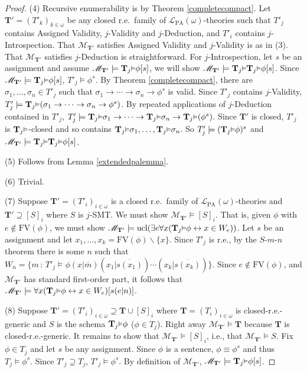 \documentclass[reqno]{article}
\theoremstyle{definition}
\def\L{\mathscr{L}}
\def\M{\mathscr{M}}
\def\T{\mathbf{T}}
\def\FV{\mathrm{FV}}
\def\LPA{\L_{\mathrm{PA}}}
\renewcommand{\Pr}[1]{\T_{#1}\mbox{\small${\vDash}$}}
\newcommand{\ucl}[1]{\mathrm{ucl}(#1)}
\begin{document}
\begin{proof}
\item
(4)
Recursive enumerability is by Theorem \ref{completecompact}.
Let $\T'=(T'_k)_{k\in\omega}$ be any closed r.e.~family
of $\LPA(\omega)$-theories such that $T'_j$ contains Assigned Validity, $j$-Validity and $j$-Deduction,
and $T'_i$ contains $j$-Introspection.
That $\M_{\T'}$ satisfies Assigned Validity and $j$-Validity is as in (3).
That $\M_{\T'}$ satisfies $j$-Deduction is straightforward.
For $j$-Introspection, let $s$ be an assignment and assume
$\M_{\T'}\models \Pr j\phi[s]$, we will show $\M_{\T'}\models\Pr j\Pr j\phi[s]$.
Since $\M_{\T'}\models \Pr j\phi[s]$, $T'_j\models\phi^s$.
By Theorem \ref{completecompact}, there are $\sigma_1,\ldots,\sigma_n\in T'_j$
such that $\sigma_1\rightarrow\cdots\rightarrow\sigma_n\rightarrow\phi^s$
is valid.
Since $T'_j$ contains $j$-Validity,
$T'_j\models \Pr j(\sigma_1\rightarrow\cdots\rightarrow\sigma_n\rightarrow\phi^s)$.
By repeated applications of $j$-Deduction contained in $T'_j$,
$T'_j\models \Pr j\sigma_1\rightarrow\cdots\rightarrow\Pr j\sigma_n\rightarrow \Pr j(\phi^s)$.
Since $\T'$ is closed, $T'_j$ is $\Pr j$-closed and so contains $\Pr j\sigma_1,\ldots,\Pr j\sigma_n$.
So $T'_j\models (\Pr j\phi)^s$ and $\M_{\T'}\models \Pr j\Pr j\phi[s]$.

\item
(5)
Follows from Lemma \ref{extendedpalemma}.

\item
(6)
Trivial.

\item
(7)
Suppose $\T'=(T'_i)_{i\in\omega}$ is a closed r.e.~family of
$\LPA(\omega)$-theories and $\T'\supseteq [S]_i$ where $S$ is $j$-SMT.
We must show $\M_{\T'}\models [S]_i$.
That is, given $\phi$ with $e\not\in\FV(\phi)$, we must show
$\M_{\T'}\models \ucl{\exists e \forall x (\Pr j \phi \leftrightarrow x\in W_e)}$.
Let $s$ be an assignment and let $x_1,\ldots,x_k=\FV(\phi)\backslash\{x\}$.
Since $T'_j$ is r.e., by the $S$-$m$-$n$ theorem there is some $n$
such that $W_n=\{m\,:\,T'_j\models \phi(x|\overline{m})(x_1|\overline{s(x_1)})
\cdots (x_k|\overline{s(x_k)})\}$.  Since $e\not\in\FV(\phi)$, and $\M_{\T'}$ has
standard first-order part, it follows that
$\M_{\T'}\models \forall x(\Pr j \phi\leftrightarrow x\in W_e)[s(e|n)]$.

\item
(8)
Suppose $\T'=(T'_i)_{i\in\omega}\supseteq \T\cup [S]_i$
where $\T=(T_i)_{i\in\omega}$ is closed-r.e.-generic and $S$ is the schema
$\Pr j \phi$ ($\phi\in T_j$).  Right away $\M_{\T'}\models \T$
because $\T$ is closed-r.e.-generic.  It remains to show that
$\M_{\T'}\models [S]_i$, i.e., that $\M_{\T'}\models S$.
Fix $\phi\in T_j$ and let $s$ be any assignment.  Since $\phi$ is a sentence,
$\phi\equiv\phi^s$ and thus
$T_j\models\phi^s$.  Since $T'_j\supseteq T_j$, $T'_j\models\phi^s$.
By definition of $\M_{\T'}$, $\M_{\T'}\models \Pr j\phi[s]$.
\end{proof}
\end{document}
